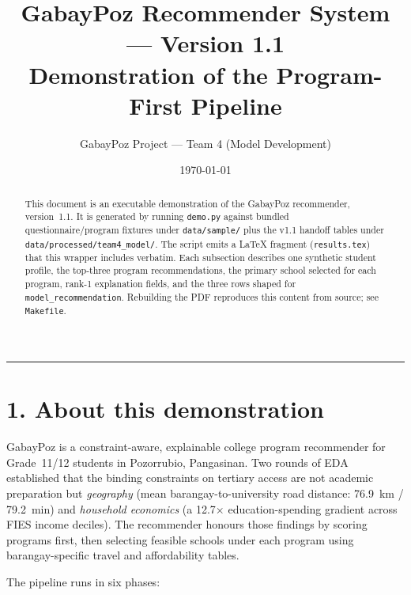 \documentclass[11pt,a4paper]{article}
\title{\textbf{GabayPoz Recommender System --- Version 1.1}\\[0.4em]
       \large Demonstration of the Program-First Pipeline}
\author{GabayPoz Project --- Team 4 (Model Development)}
\date{\today}
\begin{document}
\maketitle

\begin{abstract}
\noindent
This document is an executable demonstration of the GabayPoz recommender,
version~1.1. It is generated by running \texttt{demo.py} against bundled
questionnaire/program fixtures under \texttt{data/sample/} plus the
v1.1 handoff tables under \texttt{data/processed/team4\_model/}. The script
emits a LaTeX fragment (\texttt{results.tex}) that this wrapper includes
verbatim. Each subsection describes one synthetic student profile, the
top-three program recommendations, the primary school selected for each
program, rank-1 explanation fields, and the three rows shaped for
\texttt{model\_recommendation}. Rebuilding the PDF reproduces this content
from source; see \texttt{Makefile}.
\end{abstract}

\vspace{0.5em}
\hrule
\vspace{0.5em}

\section*{1. About this demonstration}

GabayPoz is a constraint-aware, explainable college program recommender
for Grade~11/12 students in Pozorrubio, Pangasinan. Two rounds of EDA
established that the binding constraints on tertiary access are not
academic preparation but \emph{geography} (mean barangay-to-university road
distance: 76.9~km / 79.2~min) and \emph{household economics} (a 12.7$\times$
education-spending gradient across FIES income deciles). The recommender
honours those findings by scoring programs first, then selecting feasible
schools under each program using barangay-specific travel and affordability
tables.

The pipeline runs in six phases:
\end{document}
